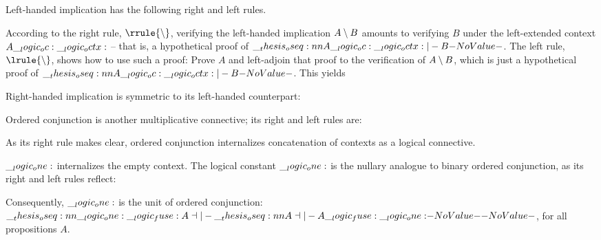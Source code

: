 Left-handed implication has the following right and left rules.
According to the right rule, $\rrule{\limp}$, verifying the left-handed implication $A \mathbin { \setminus } B$ amounts to verifying $B$ under the left-extended context $A \__logic_oc: \__logic_octx:$ -- that is, a hypothetical proof of $\oseq{A \oc \octx |- B}$.
The left rule, $\lrule{\limp}$, shows how to use such a proof:
Prove $A$ and left-adjoin that proof to the verification of $A \mathbin { \setminus } B$, which is just a hypothetical proof of $\oseq{A \oc \octx |- B}$.
This yields 

Right-handed implication is symmetric to its left-handed counterpart:

Ordered conjunction is another multiplicative connective; its right and left rules are:
As its right rule makes clear, ordered conjunction internalizes concatenation of contexts as a logical connective.

$\__logic_one:$ internalizes the empty context.
The logical constant $\__logic_one:$ is the nullary analogue to binary ordered conjunction, as its right and left rules reflect:
Consequently, $\__logic_one:$ is the unit of ordered conjunction: $\oseq{\one \fuse A \dashv|- \oseq{A \dashv|- A \fuse \one}}$, for all propositions $A$.


